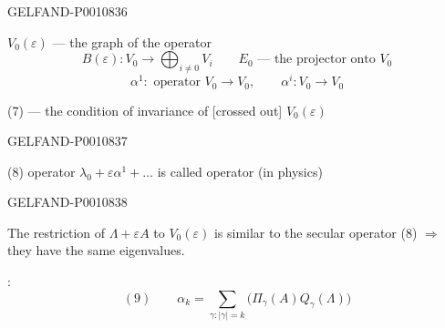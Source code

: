 \begin{GelfandAdjacentEvidence}{GELFAND-P001083}{6}


$V_0(\varepsilon)$ — the graph of the operator
\[
B(\varepsilon):V_0\longrightarrow\bigoplus_{i\ne0}V_i
\qquad E_0\text{ — the projector onto }V_0
\]
\[
\alpha^1:\text{ operator }V_0\to V_0,\qquad \alpha^i:V_0\to V_0
\]

(7) — the condition of invariance of [crossed out] $V_0(\varepsilon)$
\end{GelfandAdjacentEvidence}
\begin{GelfandAdjacentEvidence}{GELFAND-P001083}{7}


(8) operator $\lambda_0+\varepsilon\alpha^1+\ldots$ is called
 operator (in physics)
\end{GelfandAdjacentEvidence}
\begin{GelfandAdjacentEvidence}{GELFAND-P001083}{8}


The restriction of $\Lambda+\varepsilon A$ to $V_0(\varepsilon)$
is similar to the secular operator (8) $\Rightarrow$ they have the same eigenvalues.

:
\[
(9)\qquad \alpha_k=\sum_{\gamma:\lvert\gamma\rvert=k}
\bigl(\Pi_\gamma(A)Q_\gamma(\Lambda)\bigr)
\]
\end{GelfandAdjacentEvidence}
